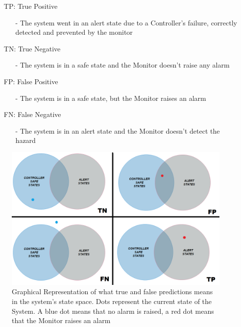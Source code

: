 \begin{itemize}
	\item[TP:] True Positive
	\begin{itemize}
		\item[-] The system went in an alert state due to a Controller's failure, correctly detected and prevented by the monitor
	\end{itemize}
	\item[TN:] True Negative
	\begin{itemize}
		\item[-] The system is in a safe state and the Monitor doesn't raise any alarm
	\end{itemize}
	\item[FP:] False Positive
	\begin{itemize}
		\item[-] The system is in a safe state, but the Monitor raises an alarm
	\end{itemize}
	\item[FN:] False Negative
	\begin{itemize}
		\item[-] The system is in an alert state and the Monitor doesn't detect the hazard
	\end{itemize}
\end{itemize}


\begin{figure}[h!]
	\includegraphics[width=\textwidth]{img/positive-negative-set.png}
	\caption{Graphical Representation of what true and false predictions means in the system's state space. Dots represent the current state of the System. A blue dot means that no alarm is raised, a red dot means that the Monitor raises an alarm}
\end{figure}

